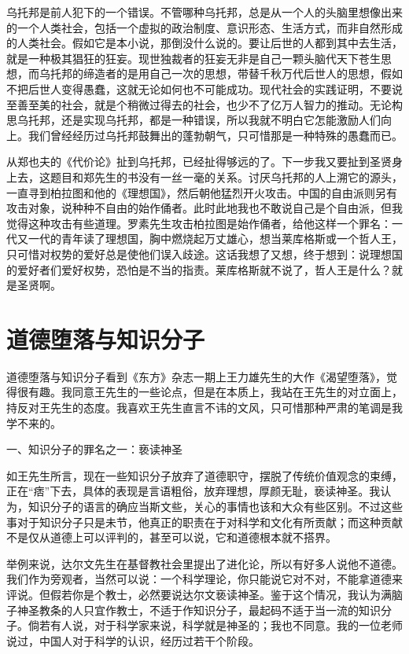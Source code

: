 乌托邦是前人犯下的一个错误。不管哪种乌托邦，总是从一个人的头脑里想像出来的一个人类社会，包括一个虚拟的政治制度、意识形态、生活方式，而非自然形成的人类社会。假如它是本小说，那倒没什么说的。要让后世的人都到其中去生活，就是一种极其猖狂的狂妄。现世独裁者的狂妄无非是自己一颗头脑代天下苍生思想，而乌托邦的缔造者的是用自己一次的思想，带替千秋万代后世人的思想，假如不把后世人变得愚蠢，这就无论如何也不可能成功。现代社会的实践证明，不要说至善至美的社会，就是个稍微过得去的社会，也少不了亿万人智力的推动。无论构思乌托邦，还是实现乌托邦，都是一种错误，所以我就不明白它怎能激励人们向上。我们曾经经历过乌托邦鼓舞出的蓬勃朝气，只可惜那是一种特殊的愚蠢而已。 

从郑也夫的《代价论》扯到乌托邦，已经扯得够远的了。下一步我又要扯到圣贤身上去，这题目和郑先生的书没有一丝一毫的关系。讨厌乌托邦的人上溯它的源头，一直寻到柏拉图和他的《理想国》，然后朝他猛烈开火攻击。中国的自由派则另有攻击对象，说种种不自由的始作俑者。此时此地我也不敢说自己是个自由派，但我觉得这种攻击有些道理。罗素先生攻击柏拉图是始作俑者，给他这样一个罪名：一代又一代的青年读了理想国，胸中燃烧起万丈雄心，想当莱库格斯或一个哲人王，只可惜对权势的爱好总是使他们误入歧途。这话我想了又想，终于想到：说理想国的爱好者们爱好权势，恐怕是不当的指责。莱库格斯就不说了，哲人王是什么？就是圣贤啊。

\chapter{道德堕落与知识分子}

道德堕落与知识分子看到《东方》杂志一期上王力雄先生的大作《渴望堕落》，觉得很有趣。我同意王先生的一些论点，但是在本质上，我站在王先生的对立面上，持反对王先生的态度。我喜欢王先生直言不讳的文风，只可惜那种严肃的笔调是我学不来的。 

一、知识分子的罪名之一：亵读神圣 

如王先生所言，现在一些知识分子放弃了道德职守，摆脱了传统价值观念的束缚，正在“痞”下去，具体的表现是言语粗俗，放弃理想，厚颜无耻，亵读神圣。我认为，知识分子的语言的确应当斯文些，关心的事情也该和大众有些区别。不过这些事对于知识分子只是未节，他真正的职责在于对科学和文化有所贡献；而这种贡献不是仅从道德上可以评判的，甚至可以说，它和道德根本就不搭界。 

举例来说，达尔文先生在基督教社会里提出了进化论，所以有好多人说他不道德。我们作为旁观者，当然可以说：一个科学理论，你只能说它对不对，不能拿道德来评说。但假若你是个教士，必然要说达尔文亵读神圣。鉴于这个情况，我认为满脑子神圣教条的人只宜作教士，不适于作知识分子，最起码不适于当一流的知识分子。倘若有人说，对于科学家来说，科学就是神圣的；我也不同意。我的一位老师说过，中国人对于科学的认识，经历过若干个阶段。 

